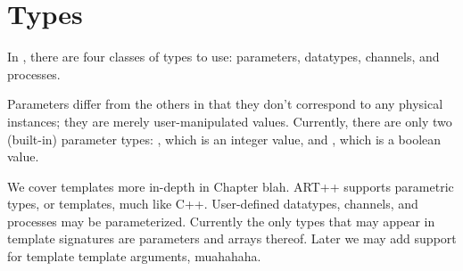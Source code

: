
\chapter{Types}
\label{sec:types}

In \artxx, there are four classes of types to use:
parameters, datatypes, channels, and processes.  

Parameters differ from the others in that they don't correspond
to any physical instances; they are merely user-manipulated values.  
Currently, there are only two (built-in) parameter types: 
\pint, which is an integer value,
and \pbool, which is a boolean value.  


We cover templates more in-depth in Chapter blah.  
ART++ supports parametric types, or templates, much like C++. 
User-defined datatypes, channels, and processes may be parameterized.  
Currently the only types that may appear in template signatures
are parameters and arrays thereof.  
Later we may add support for template template arguments, muahahaha.  


